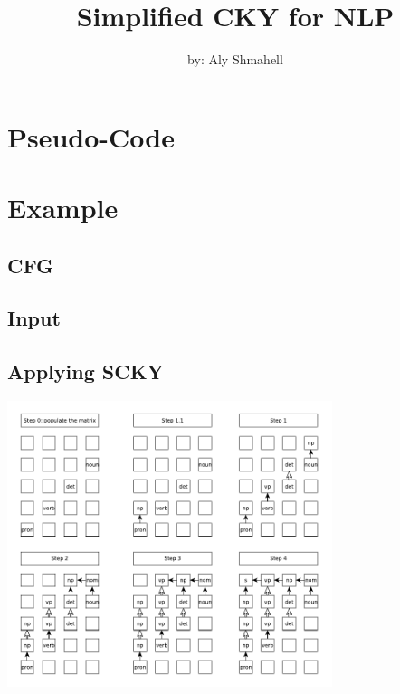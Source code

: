 \documentclass[9pt]{extarticle}
\title{Simplified CKY for NLP}
\author{by: Aly Shmahell}
\begin{document}
	\maketitle
	\begin{multicols*}{3}
		\setlength{\parskip}{0.0in}
		\tableofcontents
		\setlength{\parskip}{0.1in}
		\section{Pseudo-Code}
			
		\section{Example}
			\subsection{CFG}
				
			\subsection{Input}
				
			\subsection{Applying SCKY}
				\includegraphics[width=95mm]{example.pdf}	
    \end{multicols*}
\end{document}
